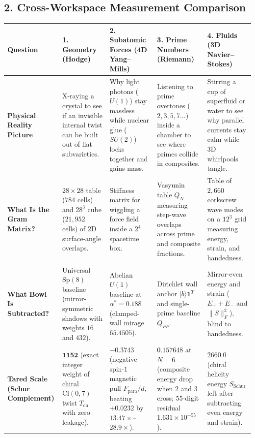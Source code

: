 \documentclass[11pt,a4paper]{article}
\begin{document}
\subsection*{2. Cross-Workspace Measurement Comparison}

\begin{table}[htbp]
\centering
\scriptsize
\setlength{\tabcolsep}{4pt}
\begin{tabular}{@{}p{2.3cm}p{3.1cm}p{3.1cm}p{3.1cm}p{3.1cm}@{}}
\toprule
\textbf{Question} & \textbf{1. Geometry (Hodge)} & \textbf{2. Subatomic Forces (4D Yang--Mills)} & \textbf{3. Prime Numbers (Riemann)} & \textbf{4. Fluids (3D Navier--Stokes)} \\
\midrule
\textbf{Physical Reality Picture} & X-raying a crystal to see if an invisible internal twist can be built out of flat subvarieties. & Why light photons ($U(1)$) stay massless while nuclear glue ($SU(2)$) locks together and gains mass. & Listening to prime overtones ($2, 3, 5, 7\dots$) inside a chamber to see where primes collide in composites. & Stirring a cup of superfluid or water to see why parallel currents stay calm while 3D whirlpools tangle. \\
\addlinespace
\textbf{What Is the Gram Matrix?} & $28\times 28$ table ($784$ cells) and $28^3$ cube ($21{,}952$ cells) of $2$D surface-angle overlaps. & Stiffness matrix for wiggling a force field inside a $2^4$ spacetime box. & Vasyunin table $Q_N$ measuring step-wave overlaps across prime and composite fractions. & Table of $2{,}660$ corkscrew wave modes on a $12^3$ grid measuring energy, strain, and handedness. \\
\addlinespace
\textbf{What Bowl Is Subtracted?} & Universal $\mathrm{Sp}(8)$ baseline (mirror-symmetric shadows with weights $16$ and $432$). & Abelian $U(1)$ baseline at $\alpha^* = 0.188$ (clamped-wall mirage $65.4505$). & Dirichlet wall anchor $|b\rangle\mathbf{1}^T$ and single-prime baseline $Q_{PP}$. & Mirror-even energy and strain ($E_+ + E_-$ and $\|S\|_F^2$), blind to handedness. \\
\addlinespace
\textbf{Tared Scale (Schur Complement)} & $\mathbf{1152}$ (exact integer weight of chiral $\mathrm{Cl}(0,7)$ twist $T_{\mathrm{ch}}$ with zero leakage). & $\mathbf{-0.3743}$ (negative spin-$1$ magnetic pull $F_{\mathrm{para}}/d$, beating $+0.0232$ by $13.47\times$--$28.9\times$). & $\mathbf{0.157648}$ at $N=6$ (composite energy drop when $2$ and $3$ cross; $55$-digit residual $1.631\times 10^{-55}$). & $\mathbf{2660.0}$ (chiral helicity energy $S_{\mathrm{Schur}}$ left after subtracting even energy and strain). \\

\end{tabular}
\end{table}
\end{document}
